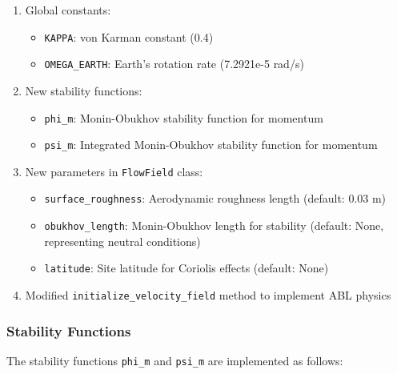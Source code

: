 \documentclass[
]{article}
\providecommand{\tightlist}{%
  \setlength{\itemsep}{0pt}\setlength{\parskip}{0pt}}
\begin{document}
\begin{enumerate}
\def\labelenumi{\arabic{enumi}.}
\tightlist
\item
  Global constants:

  \begin{itemize}
  \tightlist
  \item
    \texttt{KAPPA}: von Karman constant (0.4)
  \item
    \texttt{OMEGA\_EARTH}: Earth's rotation rate (7.2921e-5 rad/s)
  \end{itemize}
\item
  New stability functions:

  \begin{itemize}
  \tightlist
  \item
    \texttt{phi\_m}: Monin-Obukhov stability function for momentum
  \item
    \texttt{psi\_m}: Integrated Monin-Obukhov stability function for
    momentum
  \end{itemize}
\item
  New parameters in \texttt{FlowField} class:

  \begin{itemize}
  \tightlist
  \item
    \texttt{surface\_roughness}: Aerodynamic roughness length (default:
    0.03 m)
  \item
    \texttt{obukhov\_length}: Monin-Obukhov length for stability
    (default: None, representing neutral conditions)
  \item
    \texttt{latitude}: Site latitude for Coriolis effects (default:
    None)
  \end{itemize}
\item
  Modified \texttt{initialize\_velocity\_field} method to implement ABL
  physics
\end{enumerate}

\hypertarget{stability-functions}{%
\subsubsection{Stability Functions}\label{stability-functions}}

The stability functions \texttt{phi\_m} and \texttt{psi\_m} are
implemented as follows:
\end{document}
